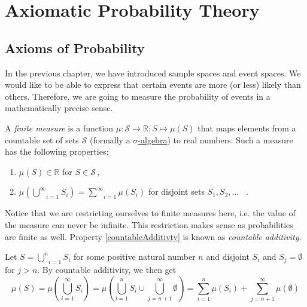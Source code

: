 \chapter{Axiomatic Probability Theory}

\section{Axioms of Probability}
In the previous chapter, we have introduced sample spaces and event spaces. We would like to be able
to express that certain events are more (or less) likely than others. 
Therefore, we are going to measure the probability of events in a mathematically precise sense. 

\begin{Definition}\label{axioms}
A \emph{finite measure} is a function $ \mu: \mathcal{S} \rightarrow \mathbb{R} : S \mapsto \mu (S) $ 
that maps elements
from a countable set of sets $ \mathcal{S} $ (formally a \href{http://en.wikipedia.org/wiki/Sigma-algebra}
{$ \sigma $-algebra}) to real numbers. Such a measure has the following properties:
\begin{enumerate}
\item $ \mu(S) \in \mathbb{R} $ for $ S \in \mathcal{S} \, ,$
\item $ \mu\left( \underset{i = 1}{\overset{\infty}{\bigcup}} S_{i} \right)
= \underset{i = 1}{\overset{\infty}{\sum}} \mu \left( S_{i} \right) $ for disjoint sets $S_1, S_2, \ldots$ \, . \label{countableAdditivty}
\end{enumerate}
\end{Definition}

Notice that we are restricting ourselves to finite measures here, i.e. the value of the measure can never
be infinite. This restriction makes sense as probabilities are finite as well. Property \ref{countableAdditivty} is 
known as \emph{countable additivity}. 

Let 
$ S = \underset{i=1}{\overset{n}{\bigcup}} S_{i} $ for some positive natural number $ n $ and disjoint 
$ S_{i} $ and $ S_{j} = 
\emptyset $ for $ j > n $. By
countable additivity, we then get
\begin{equation}
\mu(S) = \mu(\underset{i=1}{\overset{\infty}{\bigcup}} S_{i}) = \mu \left( \underset{i=1}{\overset{n}{\bigcup}} S_{i} \cup 
\underset{j=n+1}{\overset{\infty}{\bigcup}} \emptyset \right) 
= \underset{i=1}{\overset{n}{\sum}} \mu ( S_{i} )
+ \underset{j=n+1}{\overset{\infty}{\sum}} \mu ({\emptyset})
\end{equation}

